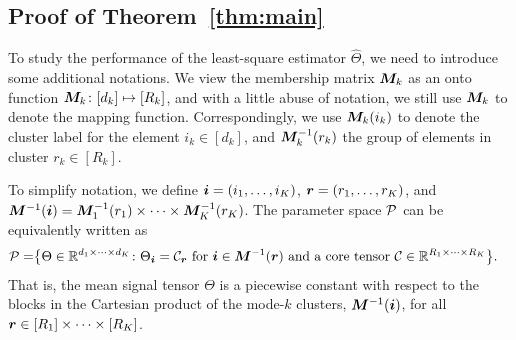 \documentclass{article}
\newtheorem{lemma}{Lemma}
\begin{document}
\begin{appendices}

\subsection{Proof of Theorem~\ref{thm:main}}
To study the performance of the least-square estimator $\hat \Theta$, we need to introduce some additional notations. We view the membership matrix $\bm M_k$ as an onto function $\bm M_k\colon [d_k]\mapsto [R_k]$, and with a little abuse of notation, we still use $\bm M_k$ to denote the mapping function. Correspondingly, we use $\bm M_k(i_k)$ to denote the cluster label for the element $i_k\in[d_k]$, and $\bm M^{-1}_k(r_k)$ the group of elements in cluster $r_k\in[R_k]$.

To simplify notation, we define $\bm{i}=(i_1,\ldots,i_K)$, $\bm{r}=(r_1,\ldots,r_K)$, and $\bm M^{-1}(\bm{i})=\bm M_1^{-1}(r_1)\times \cdots \times \bm M^{-1}_K(r_K)$. 
The parameter space $\mathcal{P}$ can be equivalently written as
\begin{align}
\mathcal{P}=&\big\{ \Theta\in\mathbb{R}^{d_1\times \cdots\times d_K}\colon \Theta_{\bm{i}}=\mathcal{C}_{\bm{r}} \text{ for }\bm{i} \in\bm M^{-1}(\bm{r})\text{ and a core tensor $\mathcal{C}\in\mathbb{R}^{R_1\times \cdots \times R_K}$} \big\}.\notag
\end{align}
That is, the mean signal tensor $\Theta$ is a piecewise constant with respect to the blocks in the Cartesian product of the mode-$k$ clusters, $\bm M^{-1}(\bm{i})$, for all $\bm{r} \in[R_1]\times \cdots\times [R_K]$. 


\end{appendices}
\end{document}
